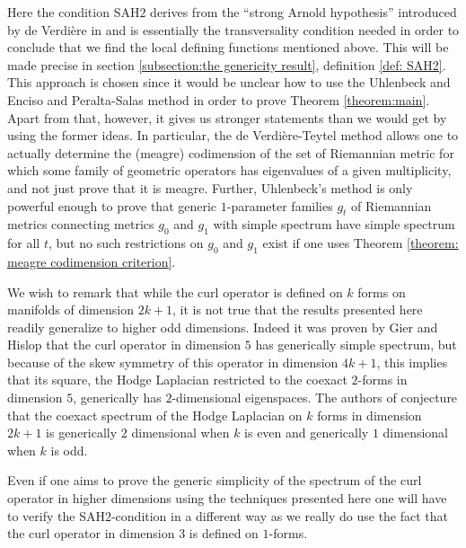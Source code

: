 Here the condition SAH$2$ derives from the ``strong Arnold hypothesis'' introduced by de Verdière in \cite{Verdière1988} and is essentially the transversality condition needed in order to conclude that we find the local defining functions mentioned above. This will be made precise in section \ref{subsection:the genericity result}, definition \ref{def: SAH2}. This approach is chosen since it would be unclear how to use the Uhlenbeck and Enciso and Peralta-Salas method in order to prove Theorem \ref{theorem:main}. Apart from that, however, it gives us stronger statements than we would get by using the former ideas. In particular, the de Verdière-Teytel method allows one to actually determine the (meagre) codimension of the set of Riemannian metric for which some family of geometric operators has eigenvalues of a given multiplicity, and not just prove that it is meagre. Further, Uhlenbeck's method is only powerful enough to prove that generic $1$-parameter families $g_t$ of Riemannian metrics connecting metrics $g_0$ and $g_1$ with simple spectrum have simple spectrum for all $t$, but no such restrictions on $g_0$ and $g_1$ exist if one uses Theorem \ref{theorem: meagre codimension criterion}.\par

We wish to remark that while the curl operator is defined on $k$ forms on manifolds of dimension $2k+1$, it is not true that the results presented here readily generalize to higher odd dimensions. Indeed it was proven by Gier and Hislop \cite{GierHislop2016} that the curl operator in dimension $5$ has generically simple spectrum, but because of the skew symmetry of this operator in dimension $4k+1$, this implies that its square, the Hodge Laplacian restricted to the coexact $2$-forms in dimension $5$, generically has $2$-dimensional eigenspaces. The authors of \cite{GierHislop2016} conjecture that the coexact spectrum of the Hodge Laplacian on $k$ forms in dimension $2k+1$ is generically $2$ dimensional when $k$ is even and generically $1$ dimensional when $k$ is odd.\par
Even if one aims to prove the generic simplicity of the spectrum of the curl operator in higher dimensions using the techniques presented here one will have to verify the SAH$2$-condition in a different way as we really do use the fact that the curl operator in dimension $3$ is defined on $1$-forms.\par

